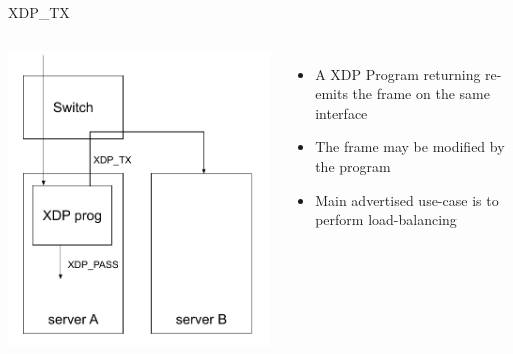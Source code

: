 \begin{frame}{XDP\_TX}
	\begin{columns}
		\includegraphics[width=\textwidth]{slides/networking-ebpf-xdp/xdp_lb.pdf}
	\begin{itemize}
		\item A XDP Program returning  re-emits the frame on the same interface
		\item The frame may be modified by the program
		\item Main advertised use-case is to perform load-balancing
	\end{itemize}
	\end{columns}
\end{frame}

